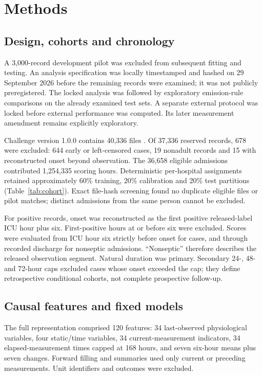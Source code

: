 \documentclass[preprint,12pt]{elsarticle}
\begin{document}
\section{Methods}
\subsection{Design, cohorts and chronology}
A 3,000-record development pilot was excluded from subsequent fitting and testing. An analysis specification was locally timestamped and hashed on 29 September 2026 before the remaining records were examined; it was not publicly preregistered. The locked analysis was followed by exploratory emission-rule comparisons on the already examined test sets. A separate external protocol was locked before external performance was computed. Its later measurement amendment remains explicitly exploratory.

Challenge version 1.0.0 contains 40,336 files \cite{reynadata,physionet}. Of 37,336 reserved records, 678 were excluded: 644 early or left-censored cases, 19 nonadult records and 15 with reconstructed onset beyond observation. The 36,658 eligible admissions contributed 1,254,335 scoring hours. Deterministic per-hospital assignments retained approximately 60\% training, 20\% calibration and 20\% test partitions (Table~\ref{tab:cohort}). Exact file-hash screening found no duplicate eligible files or pilot matches; distinct admissions from the same person cannot be excluded.

For positive records, onset was reconstructed as the first positive released-label ICU hour plus six. First-positive hours at or before six were excluded. Scores were evaluated from ICU hour six strictly before onset for cases, and through recorded discharge for nonseptic admissions. ``Nonseptic'' therefore describes the released observation segment. Natural duration was primary. Secondary 24-, 48- and 72-hour caps excluded cases whose onset exceeded the cap; they define retrospective conditional cohorts, not complete prospective follow-up.



\subsection{Causal features and fixed models}
The full representation comprised 120 features: 34 last-observed physiological variables, four static/time variables, 34 current-measurement indicators, 34 elapsed-measurement times capped at 168 hours, and seven six-hour means plus seven changes. Forward filling and summaries used only current or preceding measurements. Unit identifiers and outcomes were excluded.
\end{document}
